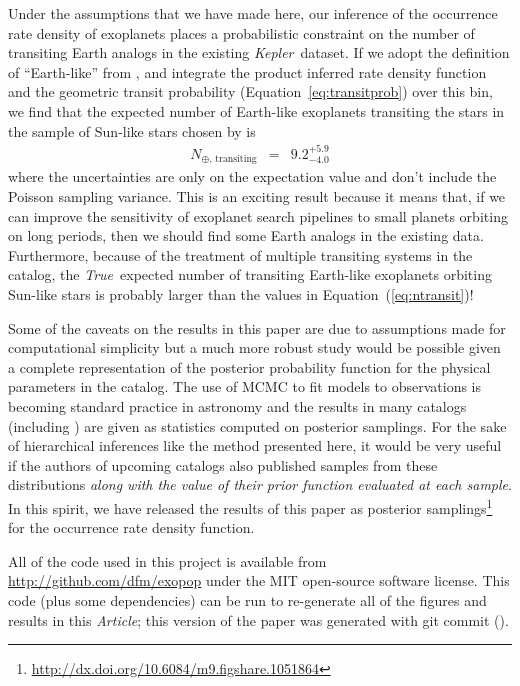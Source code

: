 \documentclass[12pt,preprint]{aastex}
\newcommand{\project}[1]{\emph{#1}}
\newcommand{\kepler}{\project{Kepler}}
\newcommand{\paper}{\textsl{Article}}
\newcommand{\foreign}[1]{\emph{#1}}
\newcommand{\True}{\foreign{True}}
\newcommand{\Eq}[1]{Equation~(\ref{eq:#1})}
\newcommand{\eq}[1]{\Eq{#1}}
\newcommand{\eqalt}[1]{Equation~\ref{eq:#1}}
\newcommand{\eqlabel}[1]{\label{eq:#1}}
\newcommand{\radius}{\ensuremath{R}}
\newcommand{\period}{\ensuremath{P}}
\begin{document}
Under the assumptions that we have made here, our inference of the occurrence
rate density of exoplanets places a probabilistic constraint on the number of
transiting Earth analogs in the existing \kepler\ dataset.
If we adopt the definition of ``Earth-like'' from \citet[][$200 \le
\period/\mathrm{day} < 400$ and $1 \le \radius/\radius_\oplus < 2$]{petigura},
and integrate the product inferred rate density function and the geometric
transit probability (\eqalt{transitprob}) over this bin, we find that the
expected number of Earth-like exoplanets transiting the stars in the sample of
Sun-like stars chosen by \citet{petigura} is
\begin{eqnarray}\eqlabel{ntransit}
N_{\oplus,\,\mathrm{transiting}} &=& 9.2_{-4.0}^{+5.9}
\end{eqnarray}
where the uncertainties are only on the expectation value and don't include
the Poisson sampling variance.
This is an exciting result because it means that, if we can improve the
sensitivity of exoplanet search pipelines to small planets orbiting on long
periods, then we should find some Earth analogs in the existing data.
Furthermore, because of the treatment of multiple transiting systems in the
catalog, the \True\ expected number of transiting Earth-like exoplanets
orbiting Sun-like stars is probably larger than the values in \eq{ntransit}!

Some of the caveats on the results in this paper are due to assumptions made
for computational simplicity but a much more robust study would be possible
given a complete representation of the posterior probability function for the
physical parameters in the catalog.
The use of MCMC to fit models to observations is becoming standard practice in
astronomy and the results in many catalogs (including \citealt{petigura}) are
given as statistics computed on posterior samplings.
For the sake of hierarchical inferences like the method presented here, it
would be very useful if the authors of upcoming catalogs also published
samples from these distributions \emph{along with the value of their prior
function evaluated at each sample}.
In this spirit, we have released the results of this paper as posterior
samplings\footnote{\url{http://dx.doi.org/10.6084/m9.figshare.1051864}} for
the occurrence rate density function.

All of the code used in this project is available from
\url{http://github.com/dfm/exopop} under the MIT open-source software license.
This code (plus some dependencies) can be run to re-generate all of the
figures and results in this \paper; this version of the paper was generated
with git commit \texttt{\githash} (\gitdate).
\end{document}
